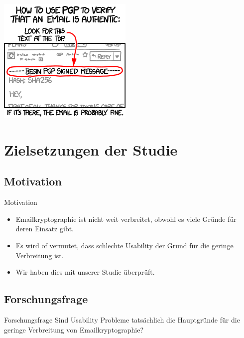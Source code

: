 \documentclass[]{beamer}
\begin{document}
\begin{frame}[plain]
	\begin{center}
		\includegraphics[scale=0.7]{pic/pgp.png}
	\end{center}
\end{frame}

\begin{frame}[plain]
	\titlepage
\end{frame}


\section{Zielsetzungen der Studie}

\subsection{Motivation}
\begin{frame}{Motivation}
\begin{itemize}
	\item Emailkryptographie ist nicht weit verbreitet, obwohl es viele Gründe für deren Einsatz gibt.
	\item Es wird of vermutet, dass schlechte Usability der Grund für die geringe Verbreitung ist.
	\item Wir haben dies mit unserer Studie überprüft.
\end{itemize}
\end{frame}


\subsection{Forschungsfrage}
\begin{frame}{Forschungsfrage}
	Sind Usability Probleme tatsächlich die Hauptgründe für die geringe Verbreitung von Emailkryptographie?

	\vspace{1.2cm}
\end{frame}
\end{document}

